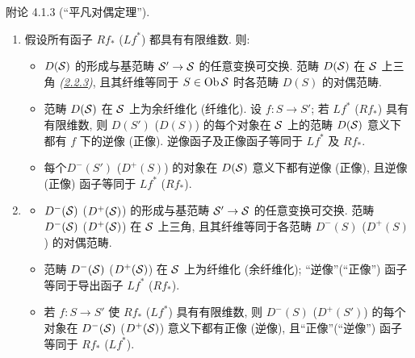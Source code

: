 \begin{enonce*}{附论 4.1.3}
(“平凡对偶定理”).
\begin{enumerate}
\renewcommand{\theenumi}{\alph{enumi}}
\renewcommand{\labelenumi}{\theenumi)}
\item 假设所有函子 $Rf_{\ast}$ (\resp $Lf^{\ast}$) 都具有有限维数. 则:
\begin{itemize}
\item[(i)] $D({\mathcal S})$ 的形成与基范畴 ${\mathcal S}'\rightarrow {\mathcal S}$ 的任意变换可交换. 范畴 $D({\mathcal S})$ 在 ${\mathcal S}$ 上三角 \emph{(\hyperref[XVII.def2.2.3]{2.2.3})}, 且其纤维等同于 $S\in \operatorname{Ob}
{\mathcal S}$ 时各范畴 $D(S)$ 的对偶范畴.

\item[(ii)] 范畴 $D({\mathcal S})$ 在 ${\mathcal S}$ 上为余纤维化 (\resp 纤维化). 设 $f:S\rightarrow S'$; 若 $Lf^{\ast}$ (\resp $Rf_{\ast}$) 具有有限维数, 则 $D(S')$ (\resp $D(S)$) 的每个对象在 ${\mathcal S}$ 上的范畴 $D({\mathcal S})$ 意义下都有 $f$ 下的逆像 (\resp 正像). 逆像函子及正像函子等同于 $Lf^{\ast}$ 及 $Rf_{\ast}$.

\item[(iii)] 每个\pageoriginale $D^{-}(S')$ (\resp $D^{+}(S)$) 的对象在 $D({\mathcal S})$ 意义下都有逆像 (\resp 正像), 且逆像 (\resp 正像) 函子等同于 $Lf^{\ast}$ (\resp $Rf_{\ast}$).
\end{itemize}

\item \begin{itemize}
\item[(i)] $D^{-}({\mathcal S})$ (\resp $D^{+}({\mathcal S})$) 的形成与基范畴 ${\mathcal S}'\rightarrow {\mathcal S}$ 的任意变换可交换. 范畴 $D^{-}({\mathcal S})$ (\resp $D^{+}({\mathcal S})$) 在 ${\mathcal S}$ 上三角, 且其纤维等同于各范畴 $D^{-}(S)$ (\resp $D^{+}(S)$) 的对偶范畴.

\item[(ii)] 范畴 $D^{-}({\mathcal S})$ (\resp $D^{+}({\mathcal S})$) 在 ${\mathcal S}$ 上为纤维化 (\resp 余纤维化); “逆像”(\resp “正像”) 函子等同于导出函子 $Lf^{\ast}$ (\resp $Rf_{\ast}$).

\item[(iii)] 若 $f:S\rightarrow S'$ 使 $Rf_{\ast}$ (\resp $Lf^{\ast}$) 具有有限维数, 则 $D^{-}(S)$ (\resp $D^{+}(S')$) 的每个对象在 $D^{-}({\mathcal S})$ (\resp $D^{+}({\mathcal S})$) 意义下都有正像 (\resp 逆像), 且“正像”(\resp “逆像”) 函子等同于 $Rf_{\ast}$ (\resp $Lf^{\ast}$).
\end{itemize}
\end{enumerate}
\end{enonce*}

